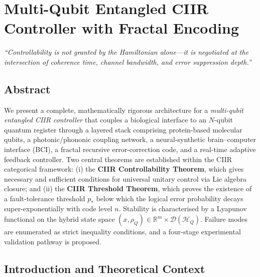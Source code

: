 \chapter{Multi-Qubit Entangled CIIR Controller with Fractal Encoding}
\label{ch:multi-qubit-controller}

\begin{center}
\textit{%
``Controllability is not granted by the Hamiltonian alone---it
is negotiated at the intersection of coherence time, channel
bandwidth, and error suppression depth.''}
\end{center}

\section*{Abstract}
\label{sec:ch21-abstract}

We present a complete, mathematically rigorous architecture for a
\emph{multi-qubit entangled CIIR controller} that couples a biological
interface to an $N$-qubit quantum register through a layered stack
comprising protein-based molecular qubits, a photonic/phononic coupling
network, a neural-synthetic brain--computer interface (BCI), a fractal
recursive error-correction code, and a real-time adaptive feedback
controller.  Two central theorems are established within the CIIR
categorical framework: (i) the \textbf{CIIR Controllability Theorem},
which gives necessary and sufficient conditions for universal unitary
control via Lie algebra closure; and (ii) the \textbf{CIIR Threshold
Theorem}, which proves the existence of a fault-tolerance threshold
$p_*$ below which the logical error probability decays
super-exponentially with code level $n$.  Stability is characterised by
a Lyapunov functional on the hybrid state space
$(x, \rho_Q) \in \mathbb{R}^m \times \mathcal{D}(\mathcal{H}_Q)$.
Failure modes are enumerated as strict inequality conditions, and a
four-stage experimental validation pathway is proposed.

\section{Introduction and Theoretical Context}
\label{sec:ch21-intro}

